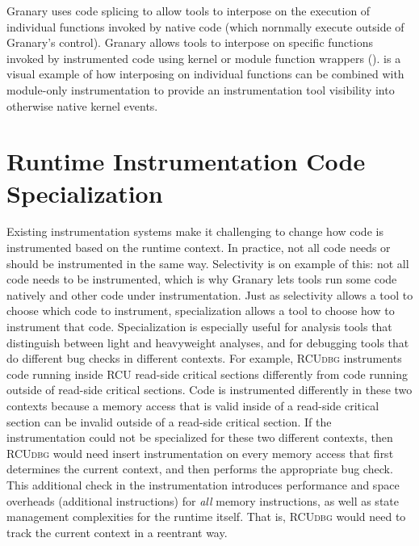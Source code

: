 \documentclass[preprint]{sigplanconf}
\newcommand{\toolname}[1]{{\scshape #1}}
\begin{document}
Granary uses code splicing \cite{KernInst,AnyWhereAnyTimeDBT,KProbes} to allow tools to interpose on the execution of individual functions invoked by native code (which nornmally execute outside of Granary's control). Granary allows tools to interpose on specific functions invoked by instrumented code using kernel or module function wrappers ().  is a visual example of how interposing on individual functions can be combined with module-only instrumentation to provide an instrumentation tool visibility into otherwise native kernel events.

\section{Runtime Instrumentation Code Specialization}\label{sec:how}

Existing instrumentation systems make it challenging to change how code is instrumented based on the runtime context. In practice, not all code needs or should be instrumented in the same way. Selectivity is on example of this: not all code needs to be instrumented, which is why Granary lets tools run some code natively and other code under instrumentation. Just as selectivity allows a tool to choose which code to instrument, specialization allows a tool to choose how to instrument that code. Specialization is especially useful for analysis tools that distinguish between light and heavyweight analyses, and for debugging tools that do different bug checks in different contexts.  For example, \toolname{RCUdbg} instruments code running inside RCU read-side critical sections differently from code running outside of read-side critical sections. Code is instrumented differently in these two contexts because a memory access that is valid inside of a read-side critical section can be invalid outside of a read-side critical section. If the instrumentation could not be specialized for these two different contexts, then \toolname{RCUdbg} would need insert instrumentation on every memory access that first determines the current context, and then performs the appropriate bug check. This additional check in the instrumentation introduces performance and space overheads (additional instructions) for \emph{all} memory instructions, as well as state management complexities for the runtime itself. That is, \toolname{RCUdbg} would need to track the current context in a reentrant way. %

\end{document}
